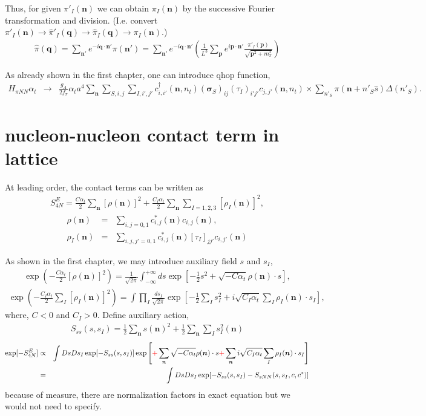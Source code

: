 \documentclass[10pt]{book}
\def\bm{\boldsymbol}
\newcommand{\bea}{\begin{eqnarray}}
\newcommand{\eea}{\end{eqnarray}}
\newcommand{\no}{\nonumber \\}
\def\vs{{\bm \sigma}}
\def\vn{{\bm n}}
\def\vp{{\bm p}}
\def\vq{{\bm q}}
\begin{document}
Thus, for given $\pi'_I(\vn)$ we can obtain $\pi_I(\vn)$ by the successive
Fourier transformation and division. 
(I.e. convert $\pi'_I(\vn)\to \hat{\pi}'_I(\vq)\to \hat{\pi}_I(\vq)\to \pi_I(\vn)$.) 
\bea 
\hat{\pi}(\vq)=\sum_{\vn'} e^{-i\vq\cdot\vn'} \pi(\vn') 
=\sum_{\vn'} e^{-i\vq\cdot\vn'} \left( 
\frac{1}{L^3}\sum_{\vp} e^{i\vp\cdot\vn'} \frac{\pi'_I(\vp)}{\sqrt{\vp^2+m_\pi^2}}         
\right) 
\eea 

As already shown in the first chapter, one can introduce qhop function, 
\bea 
H_{\pi NN}\alpha_t &\to& \frac{g_A}{2f_\pi}
\alpha_t a^4 \sum_{\vn}\sum_{S,i,j}\sum_{I,i',j'}
c^\dagger_{i,i'}(\vn,n_t) (\vs_{S})_{ij}(\tau_{I})_{i'j'}
c_{j,j'}(\vn,n_t)\times \sum_{n'_S}\pi ({\bm n}+n'_S\hat{s})\Delta(n'_S).
\nonumber
\eea 

\section{nucleon-nucleon contact term in lattice}  
At leading order, the contact terms can be written as 
\bea
S^E_{4N}=\frac{C\alpha_t}{2}\sum_{\vn}[\rho(\vn)]^2
          +\frac{C_I\alpha_t}{2}\sum_{\vn}\sum_{I=1,2,3} [\rho_I(\vn)]^2,
\eea 
\bea 
\rho(\vn)&=&\sum_{i,j=0,1} c^*_{i,j}(\vn) c_{i,j}(\vn),\no 
\rho_I(\vn)&=& \sum_{i,j,j'=0,1} c^*_{i,j}(\vn)[\tau_I]_{jj'}c_{i,j'}(\vn) 
\eea 

As shown in the first chapter, we may introduce auxiliary field $s$ and $s_I$,
\bea 
\exp\left(-\frac{C\alpha_t}{2}[\rho(\vn)]^2\right) 
=\frac{1}{\sqrt{2\pi}} \int_{-\infty}^{+\infty}
 ds \exp\left[-\frac{1}{2}s^2+\sqrt{-C\alpha_t}\rho(\vn)\cdot s\right],
\eea 
\bea 
\exp\left(-\frac{C_I \alpha_t}{2}\sum_{I}[\rho_I(\vn)]^2\right) 
=\int\prod_I \frac{ds_I}{\sqrt{2\pi}}  
 \exp\left[-\frac{1}{2}\sum_{I} s^2_I
           +i \sqrt{C_I\alpha_t}\sum_{I} \rho_I(\vn)\cdot s_I\right],
\eea 
where, $C<0$ and $C_I>0$.
Define auxiliary action,
\bea 
S_{ss}(s,s_I)=\frac{1}{2}\sum_{\vn} s(\vn)^2+\frac{1}{2}\sum_{\vn}\sum_{I} s^2_I(\vn)
\eea 
\bea 
\exp[-S^E_{4N}]
&\propto& \int D s D s_I \exp[-S_{ss}(s,s_I)]
                \exp\left[{\color{red}+}\sum_{\vn} \sqrt{-C\alpha_t}\rho(\vn)\cdot s
                     {\color{red}+}\sum_{\vn} i \sqrt{C_I\alpha_t}\sum_{I} \rho_I(\vn)\cdot s_I
                     \right]\no 
     &=& \int D s D s_I \exp[-S_{ss}(s,s_I)-S_{sNN}(s,s_I,c,c^*)]               
\eea 
because of measure, there are normalization factors in exact equation but we 
would not need to specify. 
\end{document}
